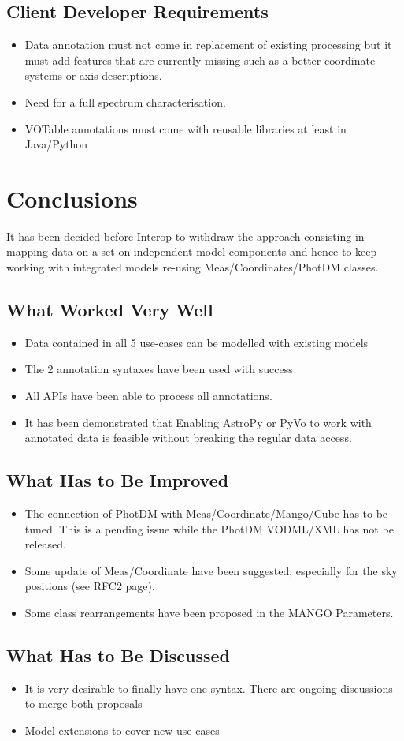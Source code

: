 \documentclass[11pt,a4paper]{ivoa}
\begin{document}
\subsection{Client Developer Requirements}

\begin{itemize}
\item Data annotation must not come in replacement of existing processing but it must 
         add features that are currently missing such as a better coordinate systems or axis descriptions.
\item Need for a full spectrum characterisation.
\item VOTable annotations must come with reusable libraries at least in Java/Python
\end{itemize}
 
 
 \section{Conclusions}
 
 It has been decided before Interop to withdraw the approach consisting in mapping data on a set on independent model components and hence to keep working with integrated models re-using Meas/Coordinates/PhotDM classes.
 
\subsection{What Worked Very Well}

\begin{itemize}
\item Data contained in all 5 use-cases can be modelled with existing models
\item The 2 annotation syntaxes have been used with success
\item All  APIs have been able to process all annotations.
\item  It has been demonstrated that Enabling AstroPy or PyVo to work with annotated data is feasible without breaking the regular data access.
\end{itemize}

\subsection{What Has to Be Improved}

\begin{itemize}
\item The connection of PhotDM with Meas/Coordinate/Mango/Cube has to be tuned. This is a pending issue while the PhotDM VODML/XML has not be released.
\item Some update of Meas/Coordinate have been suggested, especially for the sky positions (see RFC2 page).
\item Some class rearrangements have been proposed in the MANGO Parameters.
\end{itemize}

\subsection{What Has to Be Discussed}

\begin{itemize}
\item It is very desirable to finally have one syntax. There are ongoing discussions to merge both proposals 
\item Model extensions to cover new use cases
\end{itemize}
\end{document}
